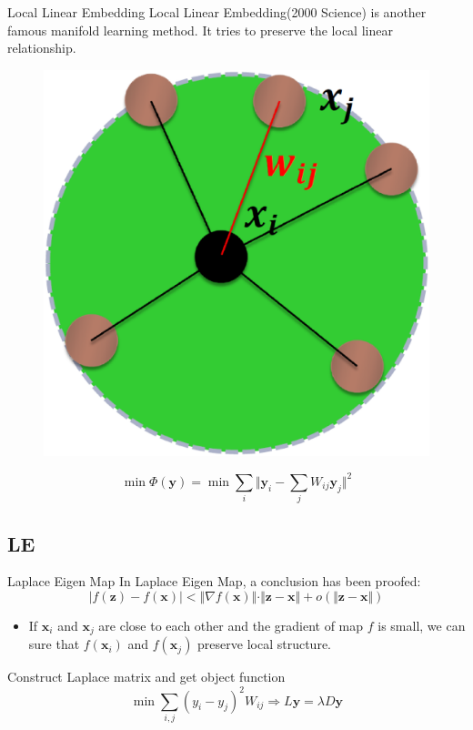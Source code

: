 \documentclass{beamer}
\newcommand{\bol}[1]{\textbf{#1}}
\begin{document}
\begin{darkframes}
    \begin{frame}{Local Linear Embedding}
    \alert{Local Linear Embedding}(2000 Science) is another famous manifold learning method. It tries to preserve the local linear relationship.
    \begin{figure}
    \centering
    \includegraphics[scale=0.15]{./figs/fig8.eps}
    \end{figure}
	\begin{displaymath}
	\min\Phi(\bol{y}) = \min\sum_i\Vert \bol{y}_i - \sum_jW_{ij}\bol{y}_j  \Vert^2
	\end{displaymath}
    \end{frame}
    
    
    \subsection{LE}
    \begin{frame}{Laplace Eigen Map}
    In Laplace Eigen Map, a conclusion has been proofed: \\
    \begin{displaymath}
    	\vert f(\bol{z} ) - f(\bol{x})\vert < \Vert \nabla f(\bol{x}) \Vert\cdot \Vert \bol{z} - \bol{x} \Vert + o(\Vert \bol{z} - \bol{x} \Vert)
    \end{displaymath}
    \begin{itemize}
    \item If $\bol{x}_i$ and $\bol{x}_j$ are close to each other and the gradient of map $f$ is small, we can sure that $f(\bol{x}_i)$ and $f(\bol{x}_j)$ preserve local structure.
    \end{itemize}
    Construct Laplace matrix and get object function
    \begin{displaymath}
    	\min\sum_{i,j}(y_i - y_j)^2W_{ij} \Rightarrow L\bol{y} = \lambda D\bol{y}
    \end{displaymath}
    \end{frame}
    

\end{darkframes}
\end{document}
